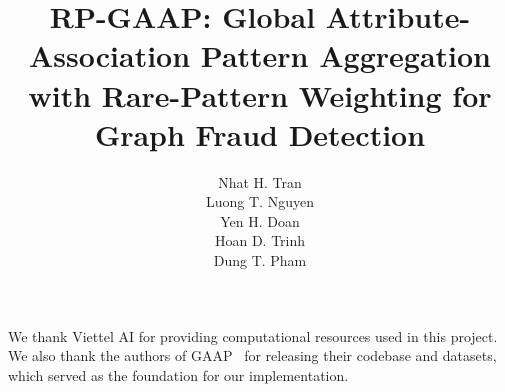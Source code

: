 \documentclass{article}
\title{RP-GAAP: Global Attribute-Association Pattern Aggregation with Rare-Pattern Weighting for Graph Fraud Detection}
\author{%
  Nhat H. Tran \\
  \And
  Luong T. Nguyen \\
  \And
  Yen H. Doan \\
  \And
  Hoan D. Trinh \\
  \And
  Dung T. Pham \\
}
\begin{document}
\maketitle










\begin{ack}
We thank Viettel AI for providing computational resources used in this project. We also thank the authors of GAAP~\cite{duan2025global} for releasing their codebase and datasets, which served as the foundation for our implementation.
\end{ack}




\newpage

\end{document}
